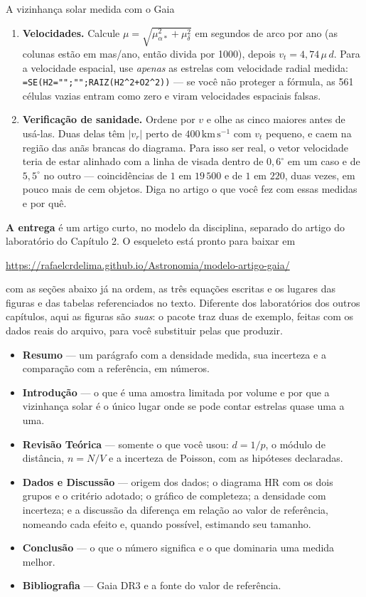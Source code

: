 \documentclass[11pt,a4paper]{article}
\begin{document}
\begin{lessonblock}[borderline west={2pt}{0pt}{astroBlue}]{A vizinhança solar medida com o Gaia}
\begin{enumerate}
não é erro --- é o que a discussão tem de explicar, usando os três limites listados no
início.
\item \textbf{Velocidades.} Calcule $\mu=\sqrt{\mu_{\alpha*}^{2}+\mu_\delta^{2}}$ em
segundos de arco por ano (as colunas estão em mas/ano, então divida por 1000), depois
$v_t=4{,}74\,\mu\,d$. Para a velocidade espacial, use \emph{apenas} as estrelas com
velocidade radial medida: \texttt{=SE(H2="";"";RAIZ(H2\textasciicircum2+O2\textasciicircum2))}
--- se você não proteger a fórmula, as 561 células vazias entram como zero e viram
velocidades espaciais falsas.
\item \textbf{Verificação de sanidade.} Ordene por $v$ e olhe as cinco maiores antes de
usá-las. Duas delas têm $|v_r|$ perto de $400\,\mathrm{km\,s^{-1}}$ com $v_t$ pequeno, e caem na região das anãs
brancas do diagrama. Para isso ser real, o vetor velocidade teria de estar alinhado com a linha de visada
dentro de $0{,}6^\circ$ em um caso e de $5{,}5^\circ$ no outro --- coincidências de $1$ em $19\,500$ e de $1$ em
$220$, duas vezes, em pouco mais de cem objetos. Diga no artigo o que você fez com essas medidas e por quê.
\end{enumerate}

\textbf{A entrega} é um artigo curto, no modelo da disciplina, separado do artigo do laboratório do Capítulo 2. O esqueleto está pronto para baixar em
\begin{center}
\url{https://rafaelcrdelima.github.io/Astronomia/modelo-artigo-gaia/}
\end{center}
com as seções abaixo já na ordem, as três equações escritas e os lugares das figuras e das tabelas referenciados no texto. Diferente dos laboratórios dos outros capítulos, aqui as figuras são \emph{suas}: o pacote traz duas de exemplo, feitas com os dados reais do arquivo, para você substituir pelas que produzir.
\begin{itemize}
\item \textbf{Resumo} --- um parágrafo com a densidade medida, sua incerteza e a
comparação com a referência, em números.
\item \textbf{Introdução} --- o que é uma amostra limitada por volume e por que a
vizinhança solar é o único lugar onde se pode contar estrelas quase uma a uma.
\item \textbf{Revisão Teórica} --- somente o que você usou: $d=1/p$, o módulo de
distância, $n=N/V$ e a incerteza de Poisson, com as hipóteses declaradas.
\item \textbf{Dados e Discussão} --- origem dos dados; o diagrama HR com os dois grupos e
o critério adotado; o gráfico de completeza; a densidade com incerteza; e a discussão da
diferença em relação ao valor de referência, nomeando cada efeito e, quando possível,
estimando seu tamanho.
\item \textbf{Conclusão} --- o que o número significa e o que dominaria uma medida
melhor.
\item \textbf{Bibliografia} --- Gaia DR3 e a fonte do valor de referência.
\end{itemize}


\end{lessonblock}
\end{document}
